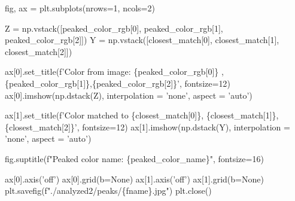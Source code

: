 \documentclass[11pt]{article}
\newenvironment{Shaded}{}{}
\newcommand{\DecValTok}[1]{\textcolor[rgb]{0.25,0.63,0.44}{{#1}}}
\newcommand{\StringTok}[1]{\textcolor[rgb]{0.25,0.44,0.63}{{#1}}}
\newcommand{\NormalTok}[1]{{#1}}
\newcommand{\SpecialCharTok}[1]{\textcolor[rgb]{0.25,0.44,0.63}{{#1}}}
\newcommand{\SpecialStringTok}[1]{\textcolor[rgb]{0.73,0.40,0.53}{{#1}}}
\newcommand{\VariableTok}[1]{\textcolor[rgb]{0.10,0.09,0.49}{{#1}}}
\newcommand{\OperatorTok}[1]{\textcolor[rgb]{0.40,0.40,0.40}{{#1}}}
\begin{document}
\begin{Shaded}
\begin{Highlighting}[]
\NormalTok{    fig, ax }\OperatorTok{=}\NormalTok{ plt.subplots(nrows}\OperatorTok{=}\DecValTok{1}\NormalTok{, ncols}\OperatorTok{=}\DecValTok{2}\NormalTok{)}

\NormalTok{    Z }\OperatorTok{=}\NormalTok{ np.vstack([peaked_color_rgb[}\DecValTok{0}\NormalTok{], peaked_color_rgb[}\DecValTok{1}\NormalTok{],}
\NormalTok{        peaked_color_rgb[}\DecValTok{2}\NormalTok{]])}
\NormalTok{    Y }\OperatorTok{=}\NormalTok{ np.vstack([closest_match[}\DecValTok{0}\NormalTok{], closest_match[}\DecValTok{1}\NormalTok{], }
\NormalTok{        closest_match[}\DecValTok{2}\NormalTok{]])}

\NormalTok{    ax[}\DecValTok{0}\NormalTok{].set_title(}\SpecialStringTok{f'Color from image: }\SpecialCharTok{\{}\NormalTok{peaked_color_rgb[}\DecValTok{0}\NormalTok{]}\SpecialCharTok{\}}
\SpecialStringTok{        ,}\SpecialCharTok{\{}\NormalTok{peaked_color_rgb[}\DecValTok{1}\NormalTok{]}\SpecialCharTok{\}}\SpecialStringTok{,}\SpecialCharTok{\{}\NormalTok{peaked_color_rgb[}\DecValTok{2}\NormalTok{]}\SpecialCharTok{\}}\SpecialStringTok{'}\NormalTok{, fontsize}\OperatorTok{=}\DecValTok{12}\NormalTok{)}
\NormalTok{    ax[}\DecValTok{0}\NormalTok{].imshow(np.dstack(Z), interpolation }\OperatorTok{=} \StringTok{'none'}\NormalTok{, aspect }\OperatorTok{=} \StringTok{'auto'}\NormalTok{)}

\NormalTok{    ax[}\DecValTok{1}\NormalTok{].set_title(}\SpecialStringTok{f'Color matched to }\SpecialCharTok{\{}\NormalTok{closest_match[}\DecValTok{0}\NormalTok{]}\SpecialCharTok{\}}\SpecialStringTok{,}
\SpecialStringTok{        }\SpecialCharTok{\{}\NormalTok{closest_match[}\DecValTok{1}\NormalTok{]}\SpecialCharTok{\}}\SpecialStringTok{,}\SpecialCharTok{\{}\NormalTok{closest_match[}\DecValTok{2}\NormalTok{]}\SpecialCharTok{\}}\SpecialStringTok{'}\NormalTok{, fontsize}\OperatorTok{=}\DecValTok{12}\NormalTok{)}
\NormalTok{    ax[}\DecValTok{1}\NormalTok{].imshow(np.dstack(Y), interpolation }\OperatorTok{=} \StringTok{'none'}\NormalTok{, aspect }\OperatorTok{=} \StringTok{'auto'}\NormalTok{)}

\NormalTok{    fig.suptitle(}\SpecialStringTok{f"Peaked color name: }\SpecialCharTok{\{}\NormalTok{peaked_color_name}\SpecialCharTok{\}}\SpecialStringTok{"}\NormalTok{, fontsize}\OperatorTok{=}\DecValTok{16}\NormalTok{)}

\NormalTok{    ax[}\DecValTok{0}\NormalTok{].axis(}\StringTok{'off'}\NormalTok{)}
\NormalTok{    ax[}\DecValTok{0}\NormalTok{].grid(b}\OperatorTok{=}\VariableTok{None}\NormalTok{)}
\NormalTok{    ax[}\DecValTok{1}\NormalTok{].axis(}\StringTok{'off'}\NormalTok{)}
\NormalTok{    ax[}\DecValTok{1}\NormalTok{].grid(b}\OperatorTok{=}\VariableTok{None}\NormalTok{)}
\NormalTok{    plt.savefig(}\SpecialStringTok{f"./analyzed2/peaks/}\SpecialCharTok{\{}\NormalTok{fname}\SpecialCharTok{\}}\SpecialStringTok{.jpg"}\NormalTok{)}
\NormalTok{    plt.close()}
\end{Highlighting}
\end{Shaded}
\end{document}
